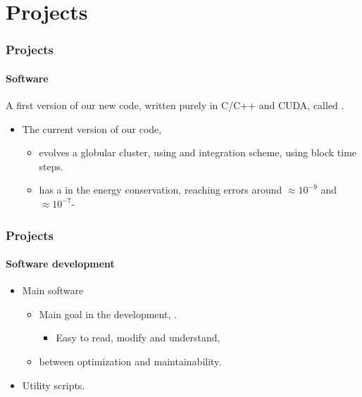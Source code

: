 \section{Projects}
\begin{frame}
    \frametitle{Projects}
    \framesubtitle{Software}

    A first version of our new {\nbody} code,
    written purely in C/C++ and CUDA, called {\GR}.

    \begin{itemize}
        \item The current version of our code,
        \begin{itemize}
            \item evolves a globular cluster, using and 
                integration scheme, using block time steps.
            \item has a  in the energy conservation,
                reaching errors around $\approx 10^{-9}$ and $\approx 10^{-7}$-
        \end{itemize}
    \end{itemize}
\end{frame}

\begin{frame}
    \frametitle{Projects}
    \framesubtitle{Software development}

    \begin{itemize}
        \item Main software
        \begin{itemize}
            \item Main goal in the development, .
            \begin{itemize}
                \item Easy to read, modify and understand,
            \end{itemize}
            \item {} between optimization and maintainability.
        \end{itemize}
        \item Utility scripts.
    \end{itemize}
\end{frame}

